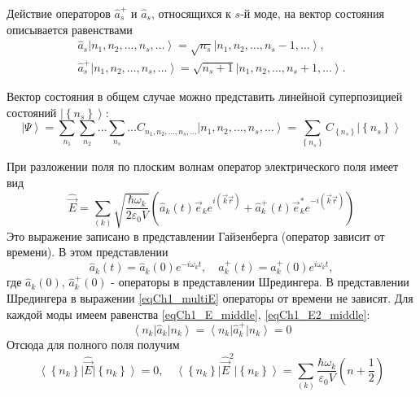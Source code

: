 Действие операторов $\hat{a}_s^{+}$ и $\hat{a}_s$,  относящихся к $s$-й
моде, на вектор состояния описывается равенствами 
\begin{eqnarray}
\hat{a}_s \left| n_1, n_2, \dots, n_s, \dots\right> = \sqrt{n_s} \left|
n_1, n_2, \dots, n_s - 1, \dots\right>,
\nonumber \\
\hat{a}_s^{+} \left| n_1, n_2, \dots, n_s, \dots\right> = \sqrt{n_s + 1} \left|
n_1, n_2, \dots, n_s + 1, \dots\right>.
\end{eqnarray} 

Вектор состояния в общем случае можно представить линейной
суперпозицией состояний  $\left| \left\{n_s\right\}\right>$: 
\begin{equation}
\left|\Psi\right> = \sum_{n_1}\sum_{n_2}\dots\sum_{n_s}\dots
C_{n_1, n_2, \dots, n_s, \dots} \left| n_1, n_2, \dots, n_s,
\dots\right>= 
\sum_{\left\{n_s\right\}} C_{\left\{n_s\right\}} \left| \left\{n_s\right\}\right>
\end{equation}

При разложении поля по плоским волнам оператор электрического поля 
имеет вид
\begin{equation}
\hat{\vec{E}} = \sum_{(k)} \sqrt{\frac{\hbar \omega_k}{2 \varepsilon_0
V}} \left( 
\hat{a}_k\left(t\right) \vec{e}_k e^{i \left(\vec{k}\vec{r} \right)} +
\hat{a}_k^{+}\left(t\right) \vec{e}_k^{*} e^{-i \left(\vec{k}\vec{r} \right)}
\right)
\label{eqCh1_multiE}
\end{equation}
Это выражение записано в представлении Гайзенберга (оператор зависит
от времени). В этом представлении 
\[
\hat{a}_k\left(t\right) = \hat{a}_k\left(0\right) e^{-i \omega_k t},
\quad
\hat{a}_k^{+}\left(t\right) = \hat{a}_k^{+}\left(0\right) e^{i \omega_k t},
\]
где $\hat{a}_k\left(0\right)$, $\hat{a}_k^{+}\left(0\right)$ -
операторы в представлении Шредингера. В представлении Шредингера в
выражении \eqref{eqCh1_multiE} операторы от времени не зависят.
Для каждой моды имеем 
равенства \eqref{eqCh1_E_middle}, \eqref{eqCh1_E2_middle}: 
\[
\left<n_k\right|\hat{a}_k\left|n_k\right> = 
\left<n_k\right|\hat{a}^{+}_k\left|n_k\right> = 0
\]
Отсюда для полного поля получим
\begin{equation}
\left<\left\{n_k\right\}\right|\hat{\vec{E}}\left|\left\{n_k\right\}\right>
= 0, \quad
\left<\left\{n_k\right\}\right|\hat{\vec{E}}^2\left|\left\{n_k\right\}\right>
= \sum_{(k)}\frac{\hbar \omega_k}{\varepsilon_0 V}
\left(n + \frac{1}{2} \right)
\end{equation}

